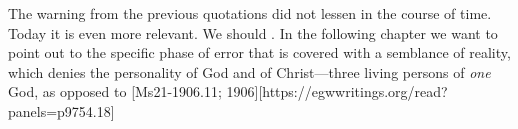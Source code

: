 The warning from the previous quotations did not lessen in the course of time. Today it is even more relevant. We should . In the following chapter we want to point out to the specific phase of error that is covered with a semblance of reality, which denies the personality of God and of Christ—three living persons of \textit{one} God, as opposed to [Ms21-1906.11; 1906][https://egwwritings.org/read?panels=p9754.18]

